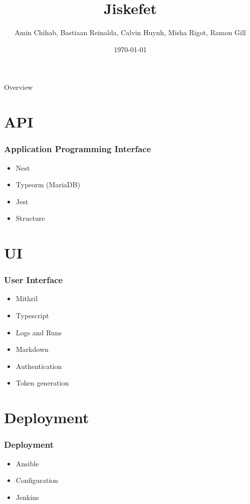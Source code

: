 \documentclass[12pt]{beamer}
\title{Jiskefet}
\author{Amin Chihab, Bastiaan Reinalda, Calvin Huynh, Misha Rigot, Ramon Gill}
\date{\today}
\begin{document}
	\begin{frame}
	\titlepage
	\end{frame}

	\begin{frame}{Overview}
		\tableofcontents
	\end{frame}

	\section{API}
    \begin{frame}
        \frametitle{Application Programming Interface}
        \begin{itemize}
        	\item Nest
        	\item Typeorm (MariaDB)
        	\item Jest
        	\item Structure
        \end{itemize}
    \end{frame}

	\section{UI}
	\begin{frame}
		\frametitle{User Interface}
		\begin{itemize}
			\item Mithril
			\item Typescript
			\item Logs and Runs
			\item Markdown
			\item Authentication
			\item Token generation
		\end{itemize}
	\end{frame}

	\section{Deployment}
	\begin{frame}
		\frametitle{Deployment}
		\begin{itemize}
			\item Ansible
			\item Configuration
			\item Jenkins
		\end{itemize}
	\end{frame}
\end{document}
